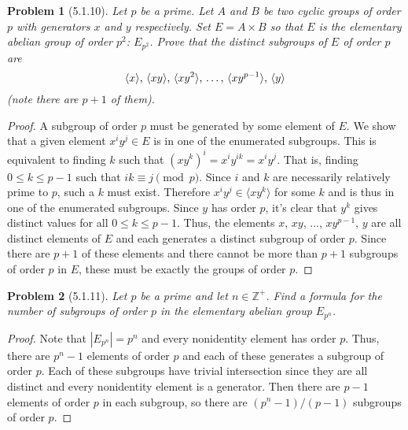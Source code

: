 \documentclass{article}
\newtheorem{problem}{Problem}
\begin{document}
\begin{problem}[5.1.10]
Let $p$ be a prime. Let $A$ and $B$ be two cyclic groups of order $p$ with generators $x$ and $y$ respectively. Set $E = A \times B$ so that $E$ is the elementary abelian group of order $p^2$: $E_{p^2}$. Prove that the distinct subgroups of $E$ of order $p$ are
\[
\text{$\langle x \rangle$, $\langle xy \rangle$, $\langle xy^2 \rangle$, \dots , $\langle xy^{p-1} \rangle$, $\langle y \rangle$}
\]
(note there are $p+1$ of them).
\end{problem}
\begin{proof}
A subgroup of order $p$ must be generated by some element of $E$. We show that a given element $x^iy^j \in E$ is in one of the enumerated subgroups. This is equivalent to finding $k$ such that $(xy^k)^i = x^iy^{ik} = x^iy^j$. That is, finding $0 \leq k \leq p-1$ such that $ik \equiv j \pmod{p}$. Since $i$ and $k$ are necessarily relatively prime to $p$, such a $k$ must exist. Therefore $x^iy^j \in \langle xy^k \rangle$ for some $k$ and is thus in one of the enumerated subgroups. Since $y$ has order $p$, it's clear that $y^k$ gives distinct values for all $0 \leq k \leq p-1$. Thus, the elements $x$, $xy$, ..., $xy^{p-1}$, $y$ are all distinct elements of $E$ and each generates a distinct subgroup of order $p$. Since there are $p+1$ of these elements and there cannot be more than $p+1$ subgroups of order $p$ in $E$, these must be exactly the groups of order $p$.
\end{proof}

\begin{problem}[5.1.11]
Let $p$ be a prime and let $n \in \mathbb{Z}^+$. Find a formula for the number of subgroups of order $p$ in the elementary abelian group $E_{p^n}$.
\end{problem}
\begin{proof}
Note that $|E_{p^n}| = p^n$ and every nonidentity element has order $p$. Thus, there are $p^n - 1$ elements of order $p$ and each of these generates a subgroup of order $p$. Each of these subgroups have trivial intersection since they are all distinct and every nonidentity element is a generator. Then there are $p-1$ elements of order $p$ in each subgroup, so there are $(p^n-1)/(p-1)$ subgroups of order $p$.
\end{proof}
\end{document}

